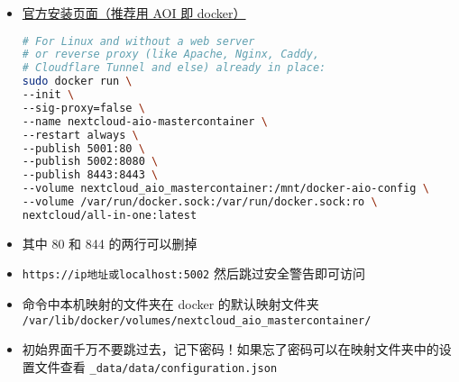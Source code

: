 
\begin{itemize}
\item \href{https://nextcloud.com/install/}{官方安装页面（推荐用 AOI 即 docker）}
\begin{lstlisting}[language=bash]
# For Linux and without a web server
# or reverse proxy (like Apache, Nginx, Caddy,
# Cloudflare Tunnel and else) already in place:
sudo docker run \
--init \
--sig-proxy=false \
--name nextcloud-aio-mastercontainer \
--restart always \
--publish 5001:80 \
--publish 5002:8080 \
--publish 8443:8443 \
--volume nextcloud_aio_mastercontainer:/mnt/docker-aio-config \
--volume /var/run/docker.sock:/var/run/docker.sock:ro \
nextcloud/all-in-one:latest
\end{lstlisting}
\item 其中 80 和 844 的两行可以删掉
\item \verb`https://ip地址或localhost:5002` 然后跳过安全警告即可访问
\item 命令中本机映射的文件夹在 docker 的默认映射文件夹 \verb`/var/lib/docker/volumes/nextcloud_aio_mastercontainer/`
\item 初始界面千万不要跳过去，记下密码！如果忘了密码可以在映射文件夹中的设置文件查看 \verb`_data/data/configuration.json`
\end{itemize}
